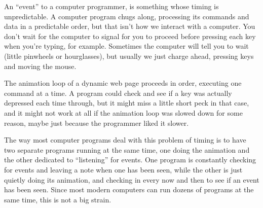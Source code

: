 \documentclass[11pt]{article}
\begin{document}








An ``event'' to a computer programmer, is something whose timing is
unpredictable.  A computer program chugs along, processing its
commands and data in a predictable order, but that isn't how we
interact with a computer.  You don't wait for the computer to signal
for you to proceed before pressing each key when you're typing, for
example.  Sometimes the computer will tell you to wait (little
pinwheels or hourglasses), but usually we just charge ahead, pressing
keys and moving the mouse.

The animation loop of a dynamic web page proceeds in order, executing
one command at a time.  A program could check and see if a key was
actually depressed each time through, but it might miss a little short
peck in that case, and it might not work at all if the animation loop
was slowed down for some reason, maybe just because the programmer
liked it slower.

The way most computer programs deal with this problem of timing is to
have two separate programs running at the same time, one doing the
animation and the other dedicated to ``listening'' for events.  One
program is constantly checking for events and leaving a note when one
has been seen, while the other is just quietly doing its animation,
and checking in every now and then to see if an event has been seen.
Since most modern computers can run dozens of programs at the same
time, this is not a big strain.
\end{document}
